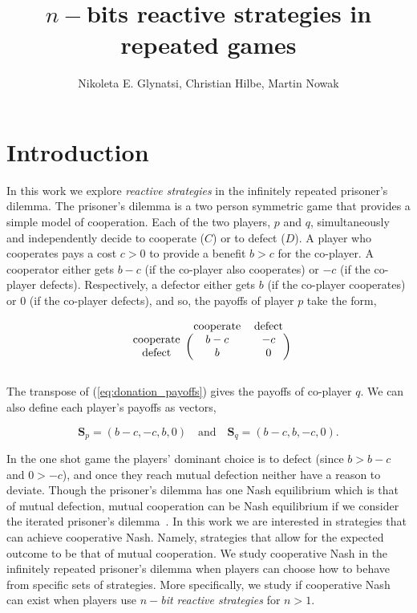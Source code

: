 \documentclass{article}
\title{$n-$bits reactive strategies in repeated games}
\author{Nikoleta E. Glynatsi, Christian Hilbe, Martin Nowak}
\date{}
\theoremstyle{definition}
\begin{document}
\maketitle

\section{Introduction}

In this work we explore \textit{reactive strategies} in the infinitely repeated
prisoner's dilemma. The prisoner's dilemma is a two person symmetric game that
provides a simple model of cooperation. Each of the two players, \(p\) and
\(q\), simultaneously and independently decide to cooperate (\(C\)) or to defect
(\(D\)). A player who cooperates pays a cost \(c > 0\) to provide a benefit
\(b > c\) for the co-player. A cooperator either gets \(b - c\) (if the
co-player also cooperates) or \(-c\) (if the co-player defects). Respectively, a defector either gets
\(b\) (if the co-player cooperates) or 0 (if the co-player defects), and so,
the payoffs of player \(p\) take the form,

\begin{equation}\label{eq:donation_payoffs}
  \begin{blockarray}{ccc}
      & \text{cooperate} & \text{defect} \\
      \begin{block}{c(cc)}
          \text{cooperate} & b - c & -c \\
          \text{defect} & b & 0 \\
      \end{block}
  \end{blockarray}
\end{equation}

The transpose of (\ref{eq:donation_payoffs}) gives the payoffs of
co-player \(q\). We can also define each player's payoffs as vectors,

\begin{equation}\label{eq:vector_payoffs}
  \mathbf{S}_{p} = (b-c, -c, b, 0) \quad \textrm{and} \quad  \mathbf{S}_{q} = (b - c, b, -c, 0).
\end{equation}

In the one shot game the players' dominant choice is to defect (since $b > b -
c$ and $0 > -c$), and once they reach mutual defection neither have a reason to
deviate. Though the prisoner's dilemma has one Nash equilibrium which is that of
mutual defection, mutual cooperation can be Nash equilibrium if we consider the
iterated prisoner's dilemma~\citep{axelrod:AAAS:1981, hilbe:PNAS:2017}. In this
work we are interested in strategies that can achieve cooperative Nash. Namely,
strategies that allow for the expected outcome to be that of mutual cooperation.
We study cooperative Nash in the infinitely
repeated prisoner's dilemma when players can choose how to behave from specific
sets of strategies. More specifically, we study if cooperative Nash can exist
when players use \textit{\(n-\)bit reactive strategies} for $n > 1$.
\end{document}
